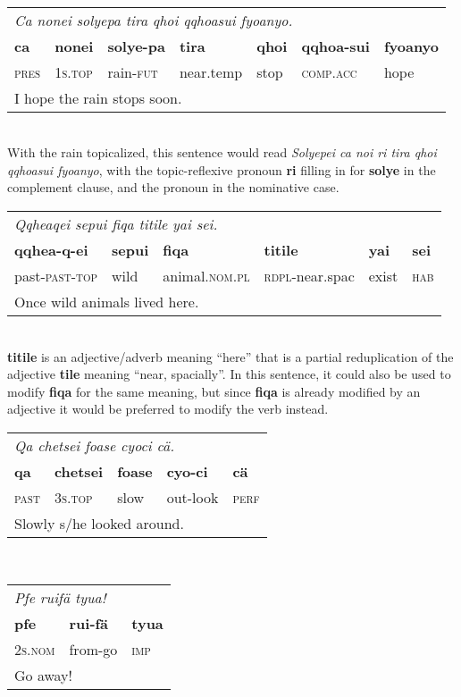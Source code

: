 \documentclass{article}
\begin{document}
\\[0.5cm]
\begin{tabular}{l l l l l l l}
\multicolumn{7}{l}{\emph{Ca nonei solyepa tira qhoi qqhoasui fyoanyo.}} \\
\textbf{ca} & \textbf{nonei} & \textbf{solye-pa} & \textbf{tira} & \textbf{qhoi} & \textbf{qqhoa-sui} & \textbf{fyoanyo} \\
\textsc{pres} & \textsc{1s.top} & rain-\textsc{fut} & near.temp & stop & \textsc{comp.acc} & hope \\
\multicolumn{7}{l}{I hope the rain stops soon.} \\
\end{tabular}
\\

With the rain topicalized, this sentence would read \emph{Solyepei ca noi ri tira qhoi qqhoasui fyoanyo}, with the topic-reflexive pronoun \textbf{ri} filling in for \textbf{solye} in the complement clause, and the pronoun in the nominative case.
\\[0.5cm]
\begin{tabular}{l l l l l l}
\multicolumn{6}{l}{\emph{Qqheaqei sepui fiqa titile yai sei.}} \\
\textbf{qqhea-q-ei} & \textbf{sepui} & \textbf{fiqa} & \textbf{titile} & \textbf{yai} & \textbf{sei} \\
past-\textsc{past-top} & wild & animal.\textsc{nom.pl} & \textsc{rdpl}-near.spac & exist & \textsc{hab} \\
\multicolumn{6}{l}{Once wild animals lived here.} \\
\end{tabular}
\\

\textbf{titile} is an adjective/adverb meaning ``here'' that is a partial reduplication of the adjective \textbf{tile} meaning ``near, spacially''.  In this sentence, it could also be used to modify \textbf{fiqa} for the same meaning, but since \textbf{fiqa} is already modified by an adjective it would be preferred to modify the verb instead.
\\[0.5cm]
\begin{tabular}{l l l l l}
\multicolumn{5}{l}{\emph{Qa chetsei foase cyoci c\"a.}} \\
\textbf{qa} & \textbf{chetsei} & \textbf{foase} & \textbf{cyo-ci} & \textbf{c\"a} \\
\textsc{past} & \textsc{3s.top} & slow & out-look & \textsc{perf} \\
\multicolumn{5}{l}{Slowly s/he looked around.} \\
\end{tabular}
\\[0.5cm]
\begin{tabular}{l l l}
\multicolumn{3}{l}{\emph{Pfe ruif\"a tyua!}} \\
\textbf{pfe} & \textbf{rui-f\"a} & \textbf{tyua} \\
\textsc{2s.nom} & from-go & \textsc{imp} \\
\multicolumn{3}{l}{Go away!} \\
\end{tabular}
\\
\end{document}

